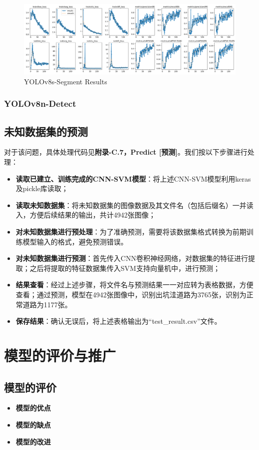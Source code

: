 \documentclass{MathorCupmodeling}
\begin{document}
	\begin{figure}[H]
		\centering
		\includegraphics[scale=0.37]{Figures/segment/SegmentResults.png}
		\caption{YOLOv8s-Segment Results}
		\label{fig:YOLOv8s-Segment-Results}
	\end{figure}
	\subsubsection{YOLOv8n-Detect}

	\subsection{未知数据集的预测}
	对于该问题，具体处理代码见\textbf{附录-C.7，Predict [预测]}。我们按以下步骤进行处理：
	\begin{itemize}
		\item \textbf{读取已建立、训练完成的CNN-SVM模型}：将上述CNN-SVM模型利用keras及pickle库读取；
		\item \textbf{读取未知数据集}：将未知数据集的图像数据及其文件名（包括后缀名）一并读入，方便后续结果的输出，共计4942张图像；
		\item \textbf{对未知数据集进行预处理}：为了准确预测，需要将该数据集格式转换为前期训练模型输入的格式，避免预测错误。
		\item \textbf{对未知数据集进行预测}：首先传入CNN卷积神经网络，对数据集的特征进行提取；之后将提取的特征数据集传入SVM支持向量机中，进行预测；
		\item \textbf{结果查看}：经过上述步骤，将文件名与预测结果一一对应转为表格数据，方便查看；通过预测，模型在4942张图像中，识别出坑洼道路为3765张，识别为正常道路为1177张。
		\item \textbf{保存结果}：确认无误后，将上述表格输出为“test\_result.csv”文件。
	\end{itemize}
	\section{模型的评价与推广}
	\subsection{模型的评价}
	\begin{itemize}
		\item \textbf{模型的优点}

		\item \textbf{模型的缺点}

		\item \textbf{模型的改进}

	\end{itemize}
\end{document}
